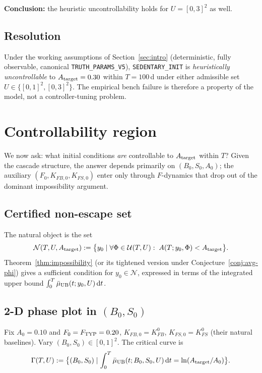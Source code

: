 \documentclass[11pt,a4paper]{article}
\theoremstyle{definition}
\newcommand{\dd}{\,\mathrm{d}}
\begin{document}
\textbf{Conclusion:} the heuristic uncontrollability holds for $U = [0,3]^2$ as well.

\subsection{Resolution}

Under the working assumptions of Section~\ref{sec:intro} (deterministic, fully observable, canonical \texttt{TRUTH\_PARAMS\_V5}), \texttt{SEDENTARY\_INIT} is \emph{heuristically uncontrollable} to $A_{\rm target} = 0.30$ within $T = 100$\,d under either admissible set $U \in \{[0,1]^2, [0,3]^2\}$. The empirical bench failure is therefore a property of the model, not a controller-tuning problem.

\section{Controllability region} \label{sec:region}

We now ask: what initial conditions \emph{are} controllable to $A_{\rm target}$ within $T$? Given the cascade structure, the answer depends primarily on $(B_0, S_0, A_0)$; the auxiliary $(F_0, K_{FB,0}, K_{FS,0})$ enter only through $F$-dynamics that drop out of the dominant impossibility argument.

\subsection{Certified non-escape set}

The natural object is the set
\[
\mathcal{N}(T, U, A_{\rm target}) := \big\{ y_0 \mid \forall \Phi \in \mathcal{U}(T, U):\; A(T; y_0, \Phi) < A_{\rm target} \big\}.
\]
Theorem~\ref{thm:impossibility} (or its tightened version under Conjecture~\ref{conj:avg-phi}) gives a sufficient condition for $y_0 \in \mathcal{N}$, expressed in terms of the integrated upper bound $\int_0^T \bar\mu_{\rm UB}(t; y_0, U) \dd t$.

\subsection{2-D phase plot in $(B_0, S_0)$}

Fix $A_0 = 0.10$ and $F_0 = F_{\rm TYP} = 0.20$, $K_{FB,0} = K_{FB}^0$, $K_{FS,0} = K_{FS}^0$ (their natural baselines). Vary $(B_0, S_0) \in [0, 1]^2$. The critical curve is
\[
\Gamma(T, U) := \big\{ (B_0, S_0) \mid \int_0^T \bar\mu_{\rm UB}(t; B_0, S_0, U) \dd t = \ln(A_{\rm target}/A_0) \big\}.
\]
\end{document}

